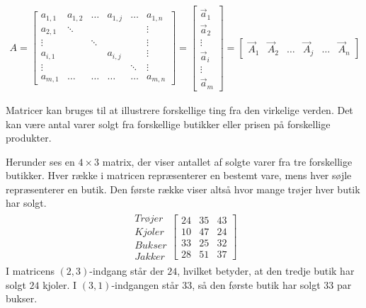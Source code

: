 \begin{align*}
A = \begin{bmatrix}
	a_{1,1} & a_{1,2} & \dots & a_{1,j} & \dots & a_{1,n} \\
	a_{2,1} & \ddots  &       &         &       & \vdots \\
	\vdots  &         & \ddots &        &       & \vdots \\
	a_{i,1} &         &       & a_{i,j} &       & \vdots \\
	\vdots  &         &       &         & \ddots& \vdots \\
	a_{m,1} & \dots   & \dots & \dots   & \dots & a_{m,n} 
\end{bmatrix}
=
\begin{bmatrix}
\vec{a}_1\\
\vec{a}_2\\
\vdots\\
\vec{a}_i\\
\vdots\\
\vec{a}_m
\end{bmatrix}
=
\begin{bmatrix}
\vec{A}_1	& \vec{A}_2	& \dots	& \vec{A}_j & \dots	& \vec{A}_n
\end{bmatrix}
\end{align*}



Matricer kan bruges til at illustrere forskellige ting fra den virkelige verden. Det kan være antal varer solgt fra forskellige butikker eller prisen på forskellige produkter. 

\begin{eks}
Herunder ses en $4 \times 3$ matrix, der viser antallet af solgte varer fra tre forskellige butikker. Hver række i matricen repræsenterer en bestemt vare, mens hver søjle repræsenterer en butik. Den første række viser altså hvor mange trøjer hver butik har solgt.
\begin{align*}
\begin{matrix}
	Trøjer \\
	Kjoler \\
	Bukser \\
	Jakker
\end{matrix}
\begin{bmatrix}
	24 & 35 & 43 \\
	10 & 47 & 24 \\
	33 & 25 & 32 \\
	28 & 51 & 37
\end{bmatrix}
\end{align*}
I matricens $(2,3)$-indgang står der $24$, hvilket betyder, at den tredje butik har solgt $24$ kjoler. I $(3,1)$-indgangen står $33$, så den første butik har solgt $33$ par bukser. 
\end{eks}

